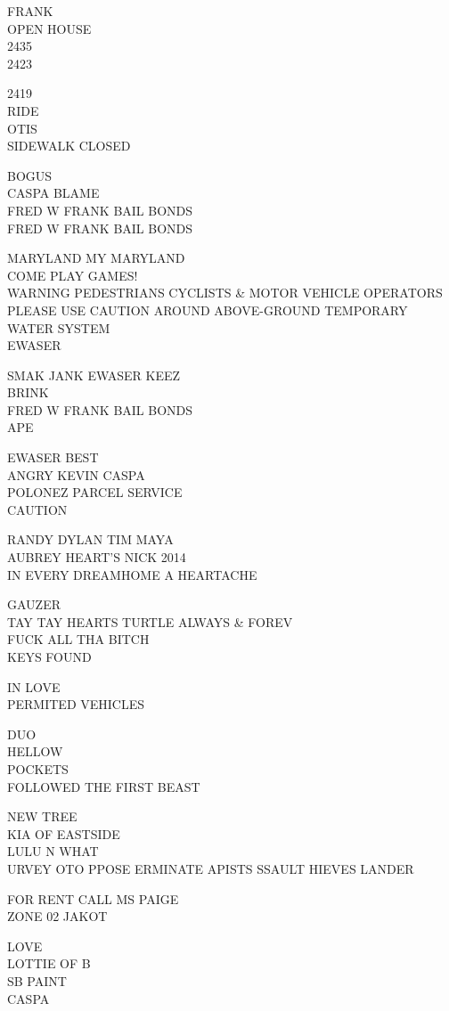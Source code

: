 \documentclass[10pt,letterpaper]{article}
\begin{document}
FRANK\\
OPEN HOUSE\\
2435\\
2423

2419\\
RIDE\\
OTIS\\
SIDEWALK CLOSED

BOGUS\\
CASPA BLAME\\
FRED W FRANK BAIL BONDS\\
FRED W FRANK BAIL BONDS

MARYLAND MY MARYLAND\\
COME PLAY GAMES!\\
WARNING PEDESTRIANS CYCLISTS \& MOTOR VEHICLE OPERATORS PLEASE USE CAUTION AROUND ABOVE{-}GROUND TEMPORARY WATER SYSTEM\\
EWASER

SMAK JANK EWASER KEEZ\\
BRINK\\
FRED W FRANK BAIL BONDS\\
APE

EWASER BEST\\
ANGRY KEVIN CASPA\\
POLONEZ PARCEL SERVICE\\
CAUTION

RANDY DYLAN TIM MAYA\\
AUBREY HEART'S NICK 2014\\
IN EVERY DREAMHOME A HEARTACHE

GAUZER\\
TAY TAY HEARTS TURTLE ALWAYS \& FOREV\\
FUCK ALL THA BITCH\\
KEYS FOUND

IN LOVE\\
PERMITED VEHICLES

DUO\\
HELLOW\\
POCKETS\\
FOLLOWED THE FIRST BEAST

NEW TREE\\
KIA OF EASTSIDE\\
LULU N WHAT\\
URVEY OTO PPOSE ERMINATE APISTS SSAULT HIEVES LANDER

FOR RENT CALL MS PAIGE\\
ZONE 02 JAKOT

LOVE\\
LOTTIE OF B\\
SB PAINT\\
CASPA
\end{document}
